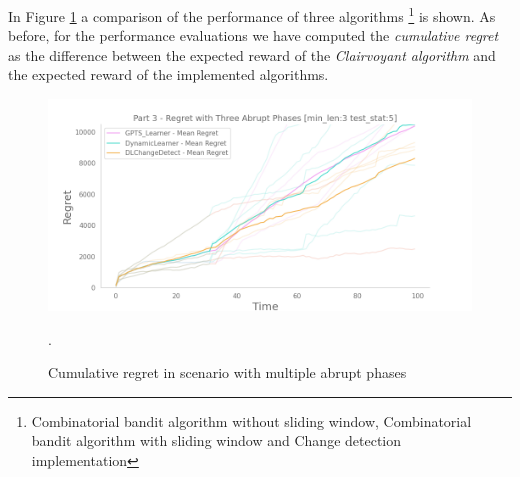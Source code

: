 In Figure \ref{regretPart3Fig} a comparison of the performance of three algorithms \footnote{Combinatorial bandit algorithm without sliding window, Combinatorial bandit algorithm with sliding window and Change detection
implementation} is shown. As before, for the performance evaluations we have computed the \textit{cumulative regret} as the difference between the expected reward of the \textit{Clairvoyant algorithm} and the expected reward of the implemented algorithms. 
\begin{figure}[!htb]
	\centering
		\includegraphics[width=\textwidth]{images/part3_min-len3_test-stat5.png}
	\caption{Cumulative regret in scenario with multiple abrupt phases}.
	\label{regretPart3Fig}
\end{figure}
